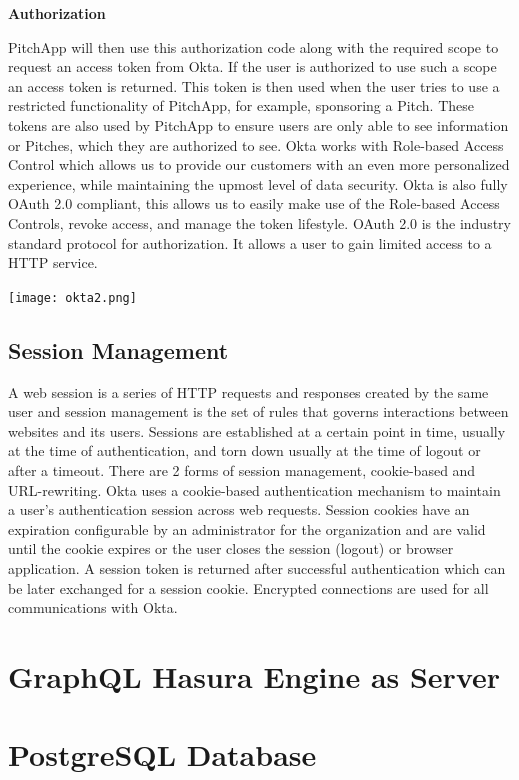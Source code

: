 \textbf{Authorization}

PitchApp will then use this authorization code along with the required scope to request an access token from Okta. If the user is authorized to use such a scope an access token is returned. This token is then used when the user tries to use a restricted functionality of PitchApp, for example, sponsoring a Pitch. These tokens are also used by PitchApp to ensure users are only able to see information or Pitches, which they are authorized to see.
Okta works with Role-based Access Control which allows us to provide our customers with an even more personalized experience, while maintaining the upmost level of data security. Okta is also fully OAuth 2.0 compliant, this allows us to easily make use of the Role-based Access Controls, revoke access, and manage the token lifestyle. OAuth 2.0 is the industry standard protocol for authorization. It allows a user to gain limited access to a HTTP service.

\begin{center}
	\texttt{[image: okta2.png]}
\end{center}

\subsection{Session Management}

A web session is a series of HTTP requests and responses created by the same user and session management is the set of rules that governs interactions between websites and its users. Sessions are established at a certain point in time, usually at the time of authentication, and torn down usually at the time of logout or after a timeout. There are 2 forms of session management, cookie-based and URL-rewriting.
Okta uses a cookie-based authentication mechanism to maintain a user's authentication session across web requests. Session cookies have an expiration configurable by an administrator for the organization and are valid until the cookie expires or the user closes the session (logout) or browser application. A session token is returned after successful authentication which can be later exchanged for a session cookie. Encrypted connections are used for all communications with Okta.

\section{GraphQL Hasura Engine as Server}
\section{PostgreSQL Database}
